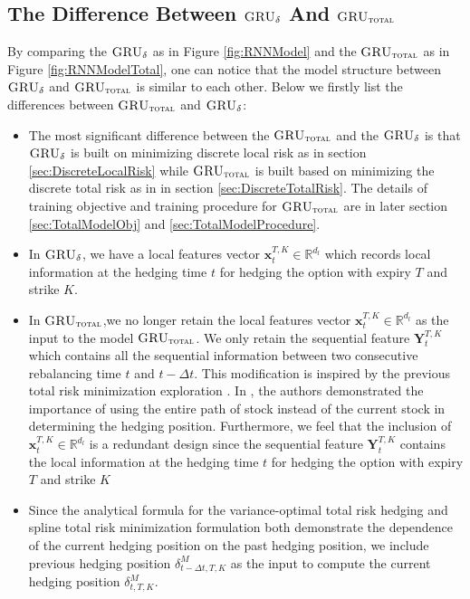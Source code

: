 \documentclass[letterpaper,12pt,titlepage,oneside,final]{book}
\numberwithin{equation}{section}
\theoremstyle{definition}
\newcommand{\model}{\textsc{GRU}_\delta}
\newcommand{\modelT}{\textsc{GRU}_{\textsc{total}}}
\newcommand{\vx}{\mathbf{x}}
\newcommand{\DT}{\Delta t}
\newcommand{\Real}{\mathbb{R}}
\begin{document}
\subsection{The Difference Between  $\model$ And $\modelT$}
By comparing the $\model$ as in Figure \ref{fig:RNNModel} and the $\modelT$ as in Figure \ref{fig:RNNModelTotal}, one can notice that the model structure between $\model$ and $\modelT$ is similar to each other. Below we firstly list the differences between $\modelT$ and $\model$:
\begin{itemize}
	
	\item The most significant difference between the $\modelT$ and the $\model$ is that $\model$ is built on minimizing discrete local risk as in section \ref{sec:DiscreteLocalRisk} while $\modelT$ is built based on minimizing the discrete total risk as in in section \ref{sec:DiscreteTotalRisk}. The details of  training objective and training procedure for $\modelT$ are in later section \ref{sec:TotalModelObj} and \ref{sec:TotalModelProcedure}.
	\item In $\model$, we have a local features vector $\vx^{T,K}_{t} \in \Real^{d_l}$ which records local information at the hedging time $t$ for hedging the option with expiry $T$ and strike $K$.
	\item In $\modelT$,we no longer retain the local features vector $\vx^{T,K}_{t} \in \Real^{d_l}$ as the input to the model $\modelT$. We only retain the sequential feature  $\mathbf{Y}_{t}^{T,K}$ which contains all the sequential information between two consecutive rebalancing time $t$ and $t-\DT$. This modification is inspired by the previous total risk minimization exploration \cite{coleman2007total,schweizer1995variance}. In \cite{coleman2007total, schweizer1995variance}, the authors demonstrated the importance of using the entire path of stock instead of the current stock in determining the hedging position. Furthermore, we feel that the inclusion of $\vx^{T,K}_{t} \in \Real^{d_l}$ is a redundant design since  the sequential feature  $\mathbf{Y}_{t}^{T,K}$ contains the local information at the hedging time $t$ for hedging the option with expiry $T$ and strike $K$
	\item Since the analytical formula for the variance-optimal total risk hedging \cite{schweizer1995variance} and spline total risk minimization formulation \cite{coleman2007total} both  demonstrate the dependence of the current hedging position on the past hedging position, we include previous hedging position $\delta^{M}_{t-\Delta t,T,K}$ as the input to compute the current hedging position $\delta^{M}_{t,T,K}$. 
	
	 
\end{itemize}
\end{document}
